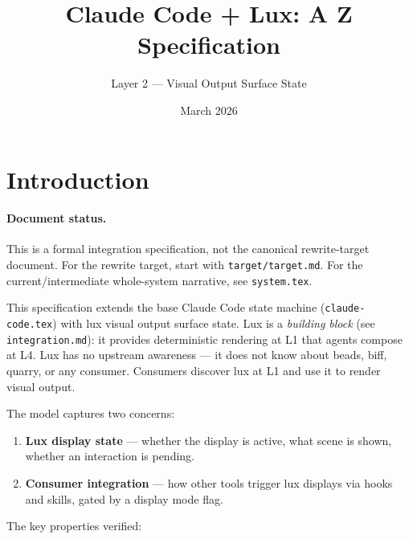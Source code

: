 \documentclass[a4paper,10pt,fleqn]{article}
\begin{document}
\title{Claude Code + Lux: A Z Specification}
\author{Layer 2 --- Visual Output Surface State}
\date{March 2026}
\maketitle

\tableofcontents
\newpage

\section{Introduction}

\paragraph{Document status.}
This is a formal integration specification, not the canonical rewrite-target
document. For the rewrite target, start with \texttt{target/target.md}. For
the current/intermediate whole-system narrative, see \texttt{system.tex}.

This specification extends the base Claude Code state machine
(\texttt{claude-code.tex}) with lux visual output surface state.
Lux is a \emph{building block} (see \texttt{integration.md}): it
provides deterministic rendering at L1 that agents compose at L4.
Lux has no upstream awareness --- it does not know about beads,
biff, quarry, or any consumer. Consumers discover lux at L1 and
use it to render visual output.

The model captures two concerns:

\begin{enumerate}
  \item \textbf{Lux display state} --- whether the display is active,
    what scene is shown, whether an interaction is pending.
  \item \textbf{Consumer integration} --- how other tools trigger
    lux displays via hooks and skills, gated by a display mode flag.
\end{enumerate}

The key properties verified:
\end{document}
